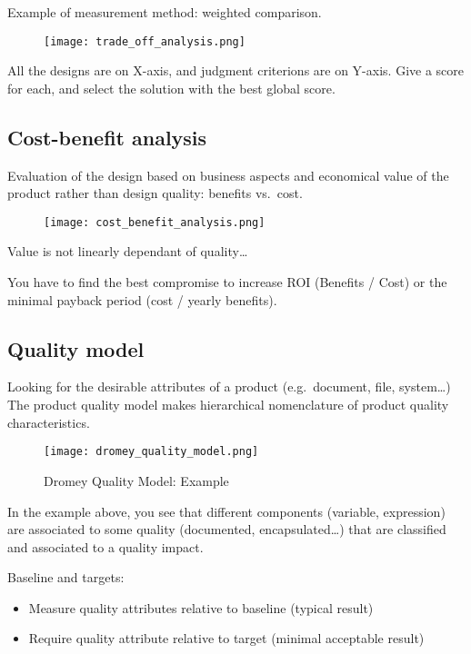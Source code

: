 Example of measurement method: weighted comparison.

\begin{figure}[!ht]
    \centering
    \texttt{[image: trade\_off\_analysis.png]}
\end{figure}

All the designs are on X-axis, and judgment criterions are on Y-axis. \newline
Give a score for each, and select the solution with the best global score.

\subsection{Cost-benefit analysis}

Evaluation of the design based on business aspects and economical value of the product rather than design quality: benefits vs.\ cost. \newline

\begin{figure}[!ht]
    \centering
    \texttt{[image: cost\_benefit\_analysis.png]}
\end{figure}

Value is not linearly dependant of quality\ldots \newline

You have to find the best compromise to increase ROI (Benefits / Cost) or the minimal payback period (cost / yearly benefits).

\subsection{Quality model}
Looking for the desirable attributes of a product (e.g.\ document, file, system\ldots)
The product quality model makes hierarchical nomenclature of product quality characteristics. \newline

\begin{figure}[!ht]
    \centering
    \texttt{[image: dromey\_quality\_model.png]}
    \caption{Dromey Quality Model: Example}
\end{figure}

In the example above, you see that different components (variable, expression) are associated to some quality (documented, encapsulated\ldots) that are classified and associated to a quality impact. \newline

Baseline and targets:

\begin{itemize}
    \item Measure quality attributes relative to baseline (typical result)
    \item Require quality attribute relative to target (minimal acceptable result)
\end{itemize}
